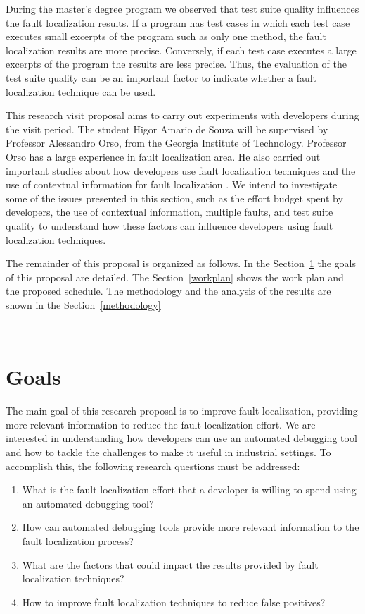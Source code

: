 \documentclass[12pt,a4paper,espaco=umemeio,noindentfirst,oneside,openany,tocpage=plain,pnumromarab,ruledheader,time,anapcustomindent]{sty/abnt}
\begin{document}
During the master's degree program \cite{souza2012b} we observed that test suite quality influences the fault localization results. If a program has test cases 
in which each test case executes small excerpts of the program such as only one method, the fault localization results are more precise. Conversely, if 
each test case executes a large excerpts of the program the results are less precise. Thus, the evaluation of the test suite quality can be an important 
factor to indicate whether a fault localization technique can be used. 

This research visit proposal aims to carry out experiments with developers during the visit period. The student Higor Amario de Souza will 
be supervised by Professor Alessandro Orso, from the Georgia Institute of Technology. Professor Orso has a large experience in fault localization 
area. He also carried out important studies about how developers use fault localization techniques \cite{parnin2011} and the use of contextual information 
for fault localization \cite{hsu2008}. We intend to investigate some of the issues presented in this section, such as the effort budget spent by 
developers, the use of contextual information, multiple faults, and test suite quality to understand how these factors can influence developers using 
fault localization techniques.

The remainder of this proposal is organized as follows. In the Section~\ref{goals} the goals of this proposal are detailed.
The Section~\ref{workplan} shows the work plan and the proposed schedule. The methodology and the analysis of the results are shown in the 
Section~\ref{methodology}

\
\section{Goals}
\label{goals}

The main goal of this research proposal is to improve fault localization, providing more relevant information to reduce the fault localization effort. 
We are interested in understanding how developers can use an automated debugging tool and how to tackle the challenges to make it useful 
in industrial settings. To accomplish this, the following research questions must be addressed:

\begin{enumerate}
 \item What is the fault localization effort that a developer is willing to spend using an automated debugging tool?
 \item How can automated debugging tools provide more relevant information to the fault localization process?
 \item What are the factors that could impact the results provided by fault localization techniques?
 \item How to improve fault localization techniques to reduce false positives?
\end{enumerate}
\end{document}
